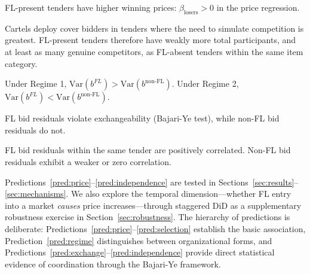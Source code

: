 \begin{prediction}
\label{pred:price}
FL-present tenders have higher winning prices: $\beta_{\text{losers}} > 0$ in the price regression.
\end{prediction}

\begin{prediction}
\label{pred:selection}
Cartels deploy cover bidders in tenders where the need to simulate competition is greatest. FL-present tenders therefore have weakly more total participants, and at least as many genuine competitors, as FL-absent tenders within the same item category.
\end{prediction}

\begin{prediction}
\label{pred:regime}
Under Regime 1, $\text{Var}(b^{FL}) > \text{Var}(b^{\text{non-FL}})$. Under Regime 2, $\text{Var}(b^{FL}) < \text{Var}(b^{\text{non-FL}})$.
\end{prediction}

\begin{prediction}
\label{pred:exchange}
FL bid residuals violate exchangeability (Bajari-Ye test), while non-FL bid residuals do not.
\end{prediction}

\begin{prediction}
\label{pred:independence}
FL bid residuals within the same tender are positively correlated. Non-FL bid residuals exhibit a weaker or zero correlation.
\end{prediction}

Predictions~\ref{pred:price}--\ref{pred:independence} are tested in Sections~\ref{sec:results}--\ref{sec:mechanisms}. We also explore the temporal dimension---whether FL entry into a market \textit{causes} price increases---through staggered DiD as a supplementary robustness exercise in Section~\ref{sec:robustness}. The hierarchy of predictions is deliberate: Predictions~\ref{pred:price}--\ref{pred:selection} establish the basic association, Prediction~\ref{pred:regime} distinguishes between organizational forms, and Predictions~\ref{pred:exchange}--\ref{pred:independence} provide direct statistical evidence of coordination through the Bajari-Ye framework.
